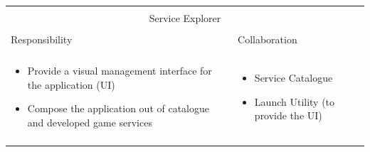 \vspace{0.5cm} \noindent         
\begin{tabular}{|l|l|}
    \cline{1-2}
    \multicolumn{2}{|c|}{} \\[-0.3cm]
    \multicolumn{2}{|c|}{Service Explorer} \\ 
    \multicolumn{2}{|c|}{} \\[-0.3cm]
    \cline{1-2}
    Responsibility & Collaboration \\
    \cline{1-2}
    & \\[-0.2cm]
    \begin{minipage}{0.47\textwidth}
        \begin{itemize}
          \item Provide a visual management interface for the application (UI)
          \item Compose the application out of catalogue and developed game
          services
        \end{itemize} 
    \end{minipage}
	&
    \begin{minipage}{0.47\textwidth}
        \begin{itemize}
          \item Service Catalogue
          \item Launch Utility (to provide the UI)
        \end{itemize} 
    \end{minipage}
	\\ & \\
    \hline
\end{tabular}


